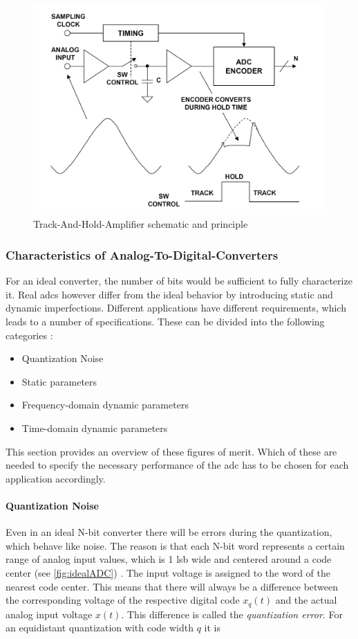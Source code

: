 \begin{figure}[tbh]
	\centering
	\includegraphics[width = \textwidth]{chap/02-theory/img/tha}
	\caption{Track-And-Hold-Amplifier schematic and principle \cite{walt}}
	\label{fig:tha}
\end{figure}

\subsubsection*{Characteristics of Analog-To-Digital-Converters} 
For an ideal converter, the number of bits would be sufficient to fully characterize it.
Real \glspl{adc} however differ from the ideal behavior by introducing static and dynamic imperfections.
Different applications have different requirements, which leads to a number of specifications. These can be divided into the following categories \cite{Lundberg}:
\begin{itemize}[noitemsep]
	\item Quantization Noise
	\item Static parameters
	\item Frequency-domain dynamic parameters
	\item Time-domain dynamic parameters
\end{itemize}
This section provides an overview of these figures of merit. Which of these are needed to specify the necessary performance of the \gls{adc} has to be chosen for each application accordingly.

\paragraph{Quantization Noise}\label{par:quant_noise}
Even in an ideal N-bit converter there will be errors during the quantization, which behave like noise. The reason is that each N-bit word represents a certain range of analog input values, which is 1 \gls{lsb} wide and centered around a code center (see \autoref{fig:idealADC}) \cite{Lundberg}. The input voltage is assigned to the word of the nearest code center. This means that there will always be a difference between the corresponding voltage of the respective digital code $x_q(t)$ and the actual analog input voltage  $x(t)$. This difference is called the \textit{quantization error}. For an equidistant quantization with code width $q$ it is

